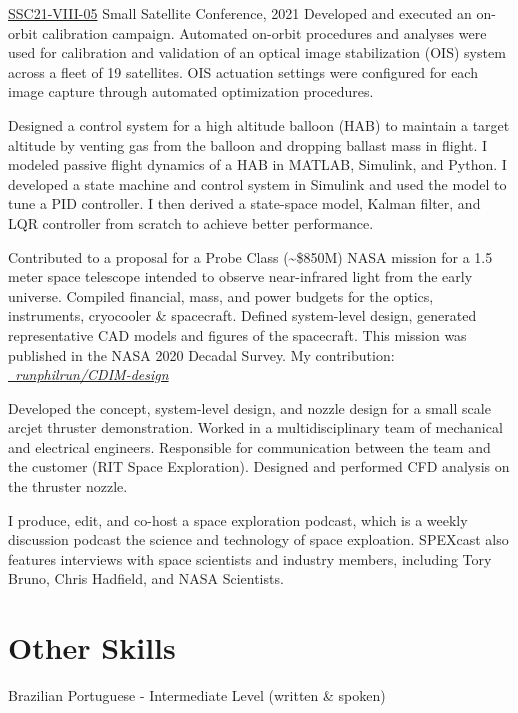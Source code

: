 \documentclass[10pt,final,sans]{resume}
\begin{document}
{\href{https://digitalcommons.usu.edu/smallsat/2021/all2021/189/}{SSC21-VIII-05}}
{Small Satellite Conference, 2021} Developed and executed an on-orbit
calibration campaign. Automated on-orbit procedures and analyses were used for
calibration and validation of an optical image stabilization (OIS) system across
a fleet of 19 satellites. OIS actuation settings were configured for each image
capture through automated optimization procedures.

Designed a control system for a high altitude balloon (HAB)
to maintain a target altitude by venting gas from the balloon and dropping
ballast mass in flight. I modeled passive flight dynamics of a HAB in MATLAB,
Simulink, and Python. I developed a state machine and control system in
Simulink and used the model to tune a PID controller. I then derived a
state-space model, Kalman filter, and LQR controller from scratch to achieve
better performance.

Contributed to a proposal for a Probe Class (\textasciitilde\$850M) NASA mission
for a 1.5 meter space telescope intended to observe near-infrared light from the
early universe. Compiled financial, mass, and power budgets for the optics,
instruments, cryocooler \& spacecraft. Defined system-level design, generated
representative CAD models and figures of the spacecraft. This mission was
published in the NASA 2020 Decadal Survey. My contribution: \href{https://github.com/runphilrun/CDIM-design/blob/master/cdim_design.pdf}{\it \faGithub\ runphilrun/CDIM-design}

Developed the concept, system-level design, and nozzle design for a small scale
arcjet thruster demonstration. Worked in a multidisciplinary team of mechanical
and electrical engineers. Responsible for communication between the team and the
customer (RIT Space Exploration). Designed and performed CFD analysis on the
thruster nozzle.

I produce, edit, and co-host a space exploration podcast, which is a weekly
discussion podcast the science and technology of space exploation. SPEXcast
also features interviews with space scientists and industry members, including
Tory Bruno, Chris Hadfield, and NASA Scientists.

\section{Other Skills}
Brazilian Portuguese - Intermediate Level (written \& spoken)
\end{document}
